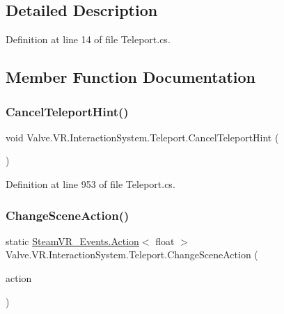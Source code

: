 \subsection{Detailed Description}


Definition at line 14 of file Teleport.\+cs.



\subsection{Member Function Documentation}
\mbox{\label{class_valve_1_1_v_r_1_1_interaction_system_1_1_teleport_a6a0d34db9fd07f435ef0b0ff071010f9}} 
\subsubsection{\texorpdfstring{CancelTeleportHint()}{CancelTeleportHint()}}
{\footnotesize\ttfamily void Valve.\+V\+R.\+Interaction\+System.\+Teleport.\+Cancel\+Teleport\+Hint (\begin{DoxyParamCaption}{ }\end{DoxyParamCaption})}



Definition at line 953 of file Teleport.\+cs.

\mbox{\label{class_valve_1_1_v_r_1_1_interaction_system_1_1_teleport_a28823c5a8399c339e777276f21a263bf}} 
\subsubsection{\texorpdfstring{ChangeSceneAction()}{ChangeSceneAction()}}
{\footnotesize\ttfamily static \mbox{\hyperlink{class_valve_1_1_v_r_1_1_steam_v_r___events_1_1_action}{Steam\+V\+R\+\_\+\+Events.\+Action}}$<$ float $>$ Valve.\+V\+R.\+Interaction\+System.\+Teleport.\+Change\+Scene\+Action (\begin{DoxyParamCaption}\item[{Unity\+Action$<$ float $>$}]{action }\end{DoxyParamCaption})\hspace{0.3cm}{\ttfamily [static]}}



